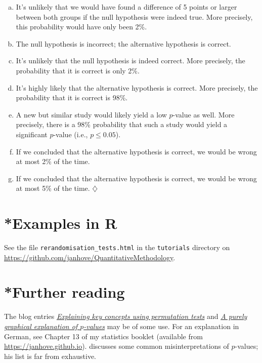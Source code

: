 \documentclass[a4paper]{tufte-book}\usepackage[]{graphicx}\usepackage[]{xcolor}
\newcommand*{\parend}[1][$\diamondsuit$]{%
\leavevmode\unskip\penalty9999 \hbox{}\nobreak\hfill
    \quad\hbox{#1}%
}
\begin{document}
\begin{enumerate}[(a)]
  \item It's unlikely that we would have found a difference of 5 points or larger between both groups if the null hypothesis were indeed true. More precisely, this probability would have only been 2\%.

  \item The null hypothesis is incorrect; the alternative hypothesis is correct.

   \item It's unlikely that the null hypothesis is indeed correct. More precisely, the probability that it is correct is only 2\%.

  \item It's highly likely that the alternative hypothesis is correct. More precisely, the probability that it is correct is 98\%.

  \item A new but similar study would likely yield a low $p$-value as well.
  More precisely, there is a 98\% probability that such a study would yield
  a significant $p$-value (i.e., $p \leq 0.05$).

  \item If we concluded that the alternative hypothesis is correct, we would be wrong at most 2\% of the time.

  \item If we concluded that the alternative hypothesis is correct, we would be wrong at most 5\% of the time. \parend
\end{enumerate}

\section{*Examples in R}
See the file \texttt{rerandomisation\_tests.html}
in the \texttt{tutorials} directory on \url{https://github.com/janhove/QuantitativeMethodology}.

\section{*Further reading}
The blog entries \href{https://janhove.github.io/posts/2015-02-26-explaining-key-concepts-using-permutation-tests/}{\textit{Explaining key concepts using permutation tests}}
and \href{https://janhove.github.io/posts/2014-09-12-a-graphical-explanation-of-p-values/}{\textit{A purely graphical explanation of $p$-values}} may be of some use.
For an explanation in German, see Chapter 13 of my statistics booklet (available from \url{https://janhove.github.io}).
\citet{Goodman2008} discusses some common misinterpretations of $p$-values;
his list is far from exhaustive.
\end{document}
